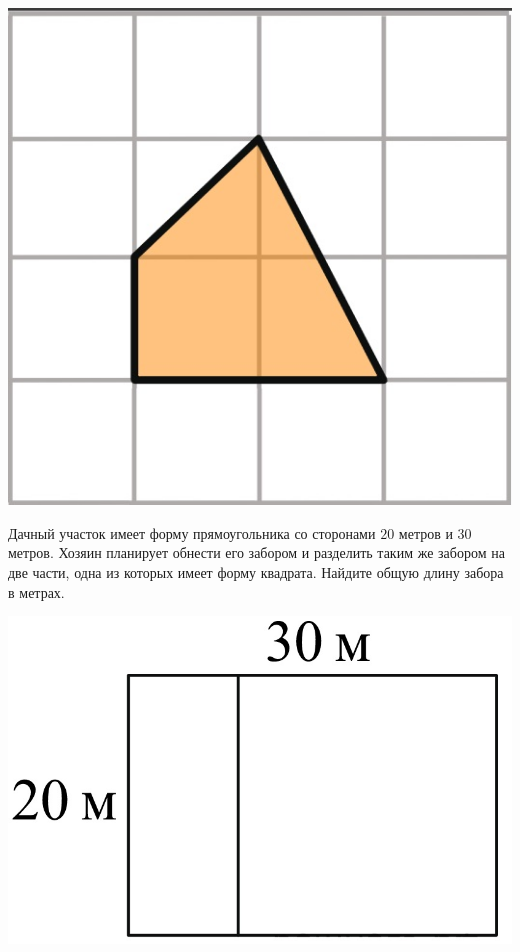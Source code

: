 \begin{homework}[number=3]
\begin{listofex}
\begin{minipage}[t]{0.27\linewidth}
			\includegraphics[align=t, width=\linewidth]{../pics/G101M8H3-9}
		\end{minipage}
		\item
		\begin{minipage}[t]{0.68\linewidth}
			Дачный участок имеет форму прямоугольника со сторонами \(20\) метров и \(30\) метров. Хозяин планирует обнести его забором и разделить таким же забором на две части, одна из которых имеет форму квадрата. Найдите общую длину забора в метрах.
		\end{minipage}
		\hspace{0.02\linewidth}
		\begin{minipage}[t]{0.27\linewidth}
			\includegraphics[align=t, width=\linewidth]{../pics/G101M8H3-10}

\end{minipage}
\end{listofex}
\end{homework}
